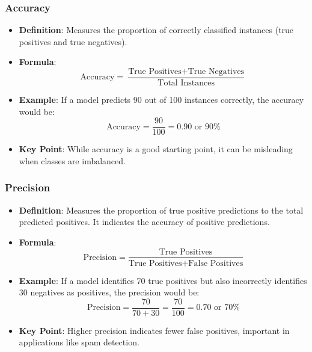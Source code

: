\documentclass[aspectratio=169]{beamer}
\begin{document}
\begin{frame}[fragile]
    \frametitle{Accuracy}
    \begin{itemize}
        \item \textbf{Definition}: Measures the proportion of correctly classified instances (true positives and true negatives).
        \item \textbf{Formula}:
        \begin{equation}
        \text{Accuracy} = \frac{\text{True Positives} + \text{True Negatives}}{\text{Total Instances}} 
        \end{equation}
        \item \textbf{Example}: If a model predicts 90 out of 100 instances correctly, the accuracy would be:
        \begin{equation}
        \text{Accuracy} = \frac{90}{100} = 0.90 \text{ or } 90\%
        \end{equation}
        \item \textbf{Key Point}: While accuracy is a good starting point, it can be misleading when classes are imbalanced.
    \end{itemize}
\end{frame}

\begin{frame}[fragile]
    \frametitle{Precision}
    \begin{itemize}
        \item \textbf{Definition}: Measures the proportion of true positive predictions to the total predicted positives. 
        It indicates the accuracy of positive predictions.
        \item \textbf{Formula}:
        \begin{equation}
        \text{Precision} = \frac{\text{True Positives}}{\text{True Positives} + \text{False Positives}} 
        \end{equation}
        \item \textbf{Example}: If a model identifies 70 true positives but also incorrectly identifies 30 negatives as positives, the precision would be:
        \begin{equation}
        \text{Precision} = \frac{70}{70 + 30} = \frac{70}{100} = 0.70 \text{ or } 70\%
        \end{equation}
        \item \textbf{Key Point}: Higher precision indicates fewer false positives, important in applications like spam detection.
    \end{itemize}
\end{frame}
\end{document}
